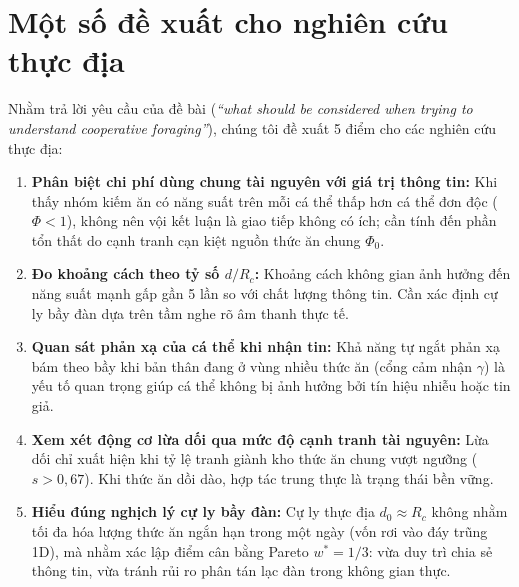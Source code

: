 \documentclass[11pt,a4paper]{report}
\begin{document}
\section{Một số đề xuất cho nghiên cứu thực địa}
Nhằm trả lời yêu cầu của đề bài (\textit{“what should be considered when trying to understand cooperative foraging”}), chúng tôi đề xuất 5 điểm cho các nghiên cứu thực địa:
\begin{enumerate}
  \item \textbf{Phân biệt chi phí dùng chung tài nguyên với giá trị thông tin:} Khi thấy nhóm kiếm ăn có năng suất trên mỗi cá thể thấp hơn cá thể đơn độc ($\Phi < 1$), không nên vội kết luận là giao tiếp không có ích; cần tính đến phần tổn thất do cạnh tranh cạn kiệt nguồn thức ăn chung $\Phi_0$.
  \item \textbf{Đo khoảng cách theo tỷ số $d/R_c$:} Khoảng cách không gian ảnh hưởng đến năng suất mạnh gấp gần 5 lần so với chất lượng thông tin. Cần xác định cự ly bầy đàn dựa trên tầm nghe rõ âm thanh thực tế.
  \item \textbf{Quan sát phản xạ của cá thể khi nhận tin:} Khả năng tự ngắt phản xạ bám theo bầy khi bản thân đang ở vùng nhiều thức ăn (cổng cảm nhận $\gamma$) là yếu tố quan trọng giúp cá thể không bị ảnh hưởng bởi tín hiệu nhiễu hoặc tin giả.
  \item \textbf{Xem xét động cơ lừa dối qua mức độ cạnh tranh tài nguyên:} Lừa dối chỉ xuất hiện khi tỷ lệ tranh giành kho thức ăn chung vượt ngưỡng ($s > 0{,}67$). Khi thức ăn dồi dào, hợp tác trung thực là trạng thái bền vững.
  \item \textbf{Hiểu đúng nghịch lý cự ly bầy đàn:} Cự ly thực địa $d_0 \approx R_c$ không nhằm tối đa hóa lượng thức ăn ngắn hạn trong một ngày (vốn rơi vào đáy trũng 1D), mà nhằm xác lập điểm cân bằng Pareto $w^* = 1/3$: vừa duy trì chia sẻ thông tin, vừa tránh rủi ro phân tán lạc đàn trong không gian thực.
\end{enumerate}
\end{document}
